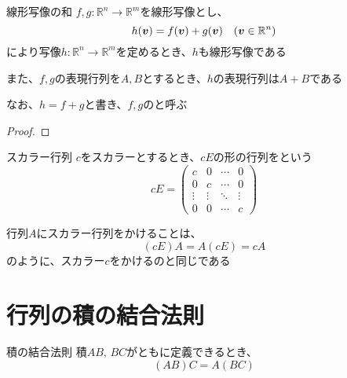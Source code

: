 \documentclass[../../../topic_linear-algebra]{subfiles}
\begin{document}
\sectionline

\begin{theorem}{線形写像の和}
  $f,g\colon \mathbb{R}^n \to \mathbb{R}^m$を線形写像とし、
  \begin{equation*}
    h(\vb*{v}) = f(\vb*{v}) + g(\vb*{v}) \quad (\vb*{v} \in \mathbb{R}^n)
  \end{equation*}
  により写像$h\colon \mathbb{R}^n \to \mathbb{R}^m$を定めるとき、$h$も線形写像である

  また、$f,g$の表現行列を$A,B$とするとき、$h$の表現行列は$A + B$である

  なお、$h = f + g$と書き、$f,g$のと呼ぶ
\end{theorem}

\begin{proof}
\end{proof}

\sectionline

\begin{definition}{スカラー行列}
  $c$をスカラーとするとき、$cE$の形の行列をという
  \begin{equation*}
    cE = \begin{pmatrix}
      c      & 0      & \cdots & 0      \\
      0      & c      & \cdots & 0      \\
      \vdots & \vdots & \ddots & \vdots \\
      0      & 0      & \cdots & c
    \end{pmatrix}
  \end{equation*}
\end{definition}

行列$A$にスカラー行列をかけることは、
\begin{equation*}
  (cE)A = A(cE) = cA
\end{equation*}
のように、スカラー$c$をかけるのと同じである

\sectionline
\section{行列の積の結合法則}

\begin{theorem}{積の結合法則}
  積$AB, \, BC$がともに定義できるとき、
  \begin{equation*}
    (AB)C = A(BC)
  \end{equation*}
\end{theorem}
\end{document}
